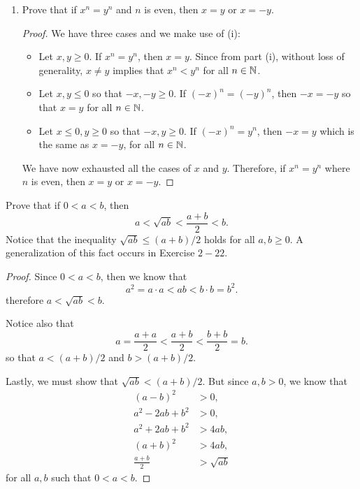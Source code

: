 \begin{exercise}[\textbf{6}]
\begin{enumerate}
\begin{proof}
         \end{proof}
         \item Prove that if $x^n=y^n$ and $n$ is even, then $x=y$ or $x=-y$.
         \begin{proof} We have three cases and we make use of (i): 
            \begin{itemize}
                \item Let $x,y \geq 0$. If $x^n=y^n$, then $x=y$. Since from
                part (i), without loss of generality, $x\neq y$ implies that
                $x^n < y^n$ for all $n \in \mathbb{N}$.
                \item Let $x,y \leq 0$ so that $-x, -y \geq 0$. If $(-x)^n =
                (-y)^n$, then $-x=-y$  so that $x=y$ for all $n\in \mathbb{N}$.
                \item Let $x\leq 0, y \geq 0 $ so that $-x, y \geq 0$. If
                $(-x)^n = y^n$, then $-x = y$ which is the same as $x=-y$, for all $n \in \mathbb{N}$.
            \end{itemize}
            We have now exhausted all the cases of $x$ and $y$. Therefore, if
            $x^n=y^n$ where $n$ is even, then $x=y$ or $x=-y$. 
         \end{proof}
\end{enumerate}
\end{exercise}
\pagebreak
\begin{exercise}[\textbf{7}] Prove that if $0<a<b$, then 
\begin{equation*}
    a<\sqrt{ab}<\frac{a+b}{2}<b.
\end{equation*}
Notice that the inequality $\sqrt{ab} \leq (a+b)/2$ holds for all $a,b \geq 0$.
A generalization of this fact occurs in Exercise $2-22$.
\begin{proof} Since $0<a<b$, then we know that 
     \begin{equation*}
         a^2 = a\cdot a < ab < b\cdot b = b^2.
     \end{equation*}
     therefore $a < \sqrt{ab}<b$.

     Notice also that 
     \begin{equation*}
         a = \frac{a+a}{2} < \frac{a+b}{2} < \frac{b+b}{2} = b.
     \end{equation*}
     so that $a < (a+b)/2$ and $b > (a+b)/2$.

     Lastly, we must show that $\sqrt{ab} < (a+b)/2$. But since $a,b >0$, we
     know that 
     \begin{align*}
         (a-b)^2 &>0, \\
         a^2-2ab+b^2 &> 0, \\
         a^2+2ab+b^2 &> 4ab, \\
         (a+b)^2 &> 4ab, \\
         \frac{a+b}{2} &> \sqrt{ab}
     \end{align*}
     for all $a,b$ such that $0<a<b$.
\end{proof}
\end{exercise}
